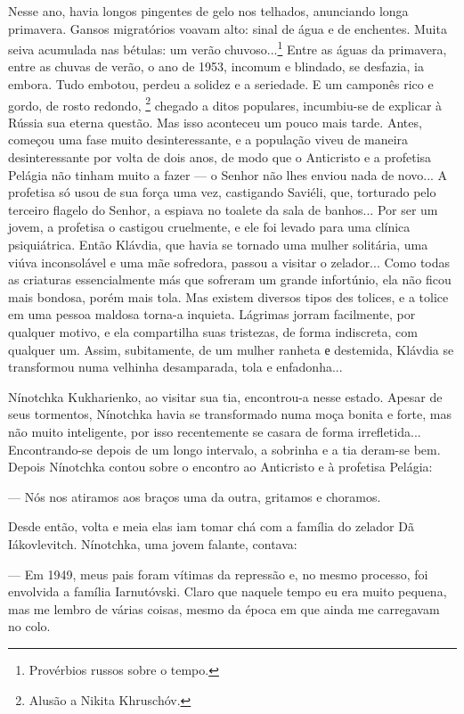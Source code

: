 Nesse ano, havia longos pingentes de gelo nos telhados, anunciando longa
primavera. Gansos migratórios voavam alto: sinal de água e de enchentes.
Muita seiva acumulada nas bétulas: um verão chuvoso...\footnote{Provérbios
  russos sobre o tempo.} Entre as águas da primavera, entre as chuvas de
verão, o ano de 1953, incomum e blindado, se desfazia, ia embora. Tudo
embotou, perdeu a solidez e a seriedade. E um camponês rico e gordo, de
rosto redondo, \footnote{Alusão a Nikita Khruschóv.} chegado a ditos
populares, incumbiu-se de explicar à Rússia sua eterna questão. Mas isso
aconteceu um pouco mais tarde. Antes, começou uma fase muito
desinteressante, e a população viveu de maneira desinteressante por
volta de dois anos, de modo que o Anticristo e a profetisa Pelágia não
tinham muito a fazer --- o Senhor não lhes enviou nada de novo... A
profetisa só usou de sua força uma vez, castigando Saviéli, que,
torturado pelo terceiro flagelo do Senhor, a espiava no toalete da sala
de banhos... Por ser um jovem, a profetisa o castigou cruelmente, e ele
foi levado para uma clínica psiquiátrica. Então Klávdia, que havia se
tornado uma mulher solitária, uma viúva inconsolável e uma mãe
sofredora, passou a visitar o zelador... Como todas as criaturas
essencialmente más que sofreram um grande infortúnio, ela não ficou mais
bondosa, porém mais tola. Mas existem diversos tipos des tolices, e a
tolice em uma pessoa maldosa torna-a inquieta. Lágrimas jorram
facilmente, por qualquer motivo, e ela compartilha suas tristezas, de
forma indiscreta, com qualquer um. Assim, subitamente, de um mulher
ranheta е destemida, Klávdia se transformou numa velhinha desamparada,
tola e enfadonha...

Nínotchka Kukharienko, ao visitar sua tia, encontrou-a nesse estado.
Apesar de seus tormentos, Nínotchka havia se transformado numa moça
bonita e forte, mas não muito inteligente, por isso recentemente se
casara de forma irrefletida... Encontrando-se depois de um longo
intervalo, a sobrinha e a tia deram-se bem. Depois Nínotchka contou
sobre o encontro ao Anticristo e à profetisa Pelágia:

--- Nós nos atiramos aos braços uma da outra, gritamos e choramos.

Desde então, volta e meia elas iam tomar chá com a família do zelador Dã
Iákovlevitch. Nínotchka, uma jovem falante, contava:

--- Em 1949, meus pais foram vítimas da repressão e, no mesmo processo,
foi envolvida a família Iarnutóvski. Claro que naquele tempo eu era
muito pequena, mas me lembro de várias coisas, mesmo da época em que
ainda me carregavam no colo.

